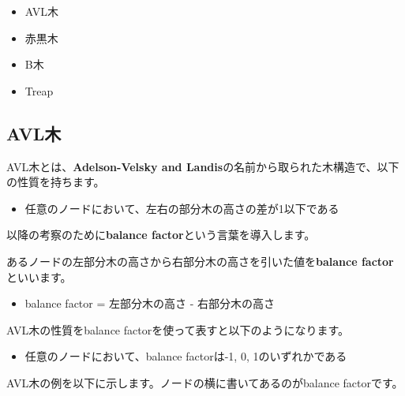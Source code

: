 \begin{itemize}
  \item AVL木
  \item 赤黒木
  \item B木
  \item Treap
\end{itemize}

\subsection{AVL木}
AVL木とは、\textbf{Adelson-Velsky and Landis}の名前から取られた木構造で、以下の性質を持ちます。

\begin{itemize}
  \item 任意のノードにおいて、左右の部分木の高さの差が1以下である
\end{itemize}

\vspace{0.5cm}

以降の考察のために\textbf{balance factor}という言葉を導入します。

\begin{definitionbox}
  あるノードの左部分木の高さから右部分木の高さを引いた値を\textbf{balance factor}といいます。
  \begin{itemize}
    \item balance factor = 左部分木の高さ - 右部分木の高さ
  \end{itemize}
\end{definitionbox}

AVL木の性質をbalance factorを使って表すと以下のようになります。

\begin{itemize}
  \item 任意のノードにおいて、balance factorは-1, 0, 1のいずれかである
\end{itemize}

AVL木の例を以下に示します。ノードの横に書いてあるのがbalance factorです。

\vspace{0.5cm}

\begin{center}
\end{center}

